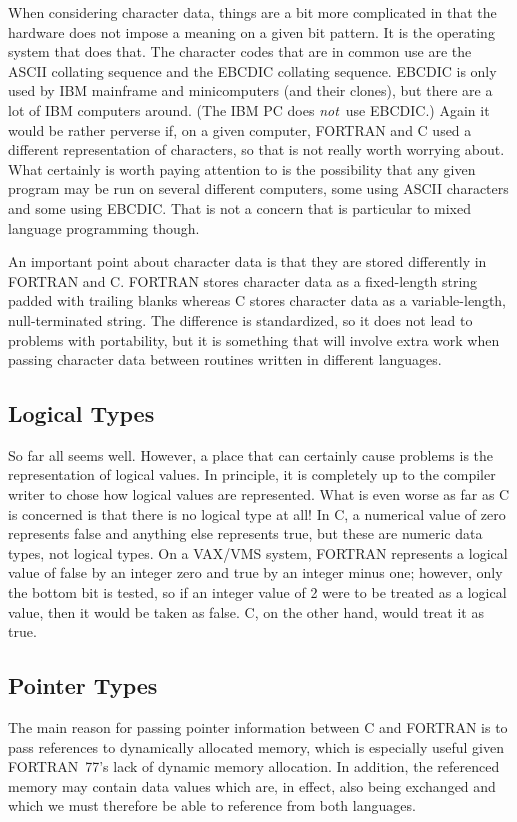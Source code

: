 \documentclass[twoside,11pt,nolof]{starlink}
\begin{document}
When considering character data, things are a bit more complicated in that the
hardware does not impose a meaning on a given bit pattern. It is the operating
system that does that. The character codes that are in common use are the ASCII
collating sequence and the EBCDIC collating sequence. EBCDIC is only used by
IBM mainframe and minicomputers (and their clones), but there are a lot of IBM
computers around. (The IBM PC does \textit{not}\, use EBCDIC\@.) Again it would be
rather perverse if, on a given computer, FORTRAN and C used a different
representation of characters, so that is not really worth worrying about. What
certainly is worth paying attention to is the possibility that any given
program may be run on several different computers, some using ASCII characters
and some using EBCDIC\@. That is not a concern that is particular to mixed
language programming though.

An important point about character data is that they are stored differently in
FORTRAN and C\@. FORTRAN stores character data as a fixed-length string padded
with trailing blanks whereas C stores character data as a variable-length,
null-terminated string.
The difference is standardized, so it does not lead to
problems with portability, but it is something that will involve extra work
when passing character data between routines written in different languages.

\subsection{Logical Types}

So far all seems well. However, a place that can certainly cause problems is
the representation of logical values. In principle, it is completely up to the
compiler writer to chose how logical values are represented. What is even worse
as far as C is concerned is that there is no logical type at all! In C, a
numerical value of zero represents false and anything else represents true, but
these are numeric data types, not logical types. On a VAX/VMS system, FORTRAN
represents a logical value of false by an integer zero and true by an integer
minus one; however, only the bottom bit is tested, so if an integer value of 2
were to be treated as a logical value, then it would be taken as false. C, on
the other hand, would treat it as true.

\subsection{Pointer Types}
The main reason for passing pointer information between C and FORTRAN
is to pass references to dynamically allocated memory, which is
especially useful given FORTRAN~77's lack of dynamic memory
allocation. In addition, the referenced memory may contain data values
which are, in effect, also being exchanged and which we must therefore
be able to reference from both languages.
\end{document}
